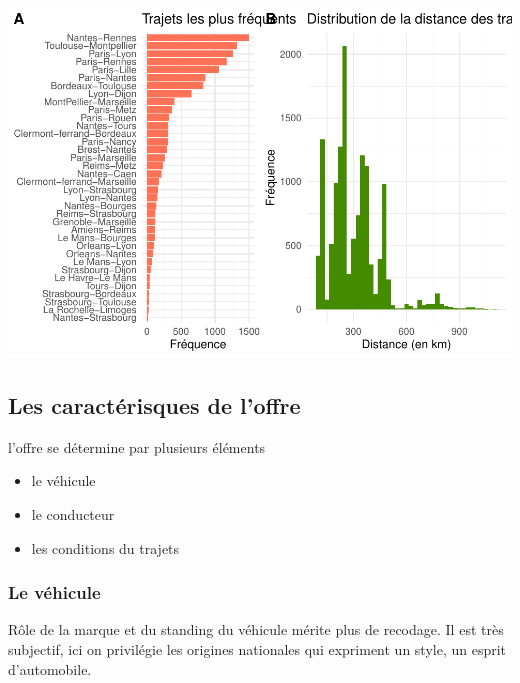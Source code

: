 \documentclass[
]{book}
\providecommand{\tightlist}{%
  \setlength{\itemsep}{0pt}\setlength{\parskip}{0pt}}
\begin{document}
\includegraphics{bookdown-demo_files/figure-latex/0902-1.pdf}

\hypertarget{les-caractuxe9risques-de-loffre}{%
\subsection{Les caractérisques de l'offre}\label{les-caractuxe9risques-de-loffre}}

l'offre se détermine par plusieurs éléments

\begin{itemize}
\tightlist
\item
  le véhicule
\item
  le conducteur
\item
  les conditions du trajets
\end{itemize}

\hypertarget{le-vuxe9hicule}{%
\subsubsection{Le véhicule}\label{le-vuxe9hicule}}

Rôle de la marque et du standing du véhicule mérite plus de recodage. Il est très subjectif, ici on privilégie les origines nationales qui expriment un style, un esprit d'automobile.
\end{document}
